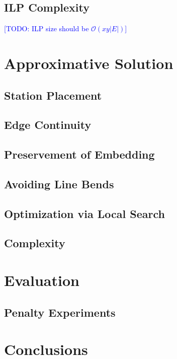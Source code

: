 \documentclass{sig-alternate-sigmod09}
\newcommand\TODO[1]{\textcolor{blue}{\small [TODO: #1]}}
\begin{document}
\subsection{ILP Complexity}

\TODO{ILP size should be $\mathcal{O}(xy|E|)$}

\section{Approximative Solution}

\subsection{Station Placement}

\subsection{Edge Continuity}

\subsection{Preservement of Embedding}

\subsection{Avoiding Line Bends}

\subsection{Optimization via Local Search}

\subsection{Complexity}

\section{Evaluation}

\subsection{Penalty Experiments}

\section{Conclusions}


\balancecolumns
\end{document}
